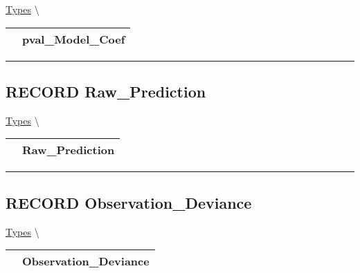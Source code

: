 \hypertarget{ecldoc:logisticregression.types.pval_model_coef}{}
\hspace{0pt} \hyperlink{ecldoc:LogisticRegression.Types}{Types} \textbackslash 

{\renewcommand{\arraystretch}{1.5}
\begin{tabularx}{\textwidth}{|>{\raggedright\arraybackslash}l|X|}
\hline
\hspace{0pt}\mytexttt{\color{red} } & \textbf{pval\_Model\_Coef} \\
\hline
\end{tabularx}
}

\par


\rule{\linewidth}{0.5pt}
\subsection*{\textsf{\colorbox{headtoc}{\color{white} RECORD}
Raw\_Prediction}}

\hypertarget{ecldoc:logisticregression.types.raw_prediction}{}
\hspace{0pt} \hyperlink{ecldoc:LogisticRegression.Types}{Types} \textbackslash 

{\renewcommand{\arraystretch}{1.5}
\begin{tabularx}{\textwidth}{|>{\raggedright\arraybackslash}l|X|}
\hline
\hspace{0pt}\mytexttt{\color{red} } & \textbf{Raw\_Prediction} \\
\hline
\end{tabularx}
}

\par


\rule{\linewidth}{0.5pt}
\subsection*{\textsf{\colorbox{headtoc}{\color{white} RECORD}
Observation\_Deviance}}

\hypertarget{ecldoc:logisticregression.types.observation_deviance}{}
\hspace{0pt} \hyperlink{ecldoc:LogisticRegression.Types}{Types} \textbackslash 

{\renewcommand{\arraystretch}{1.5}
\begin{tabularx}{\textwidth}{|>{\raggedright\arraybackslash}l|X|}
\hline
\hspace{0pt}\mytexttt{\color{red} } & \textbf{Observation\_Deviance} \\
\hline
\end{tabularx}
}

